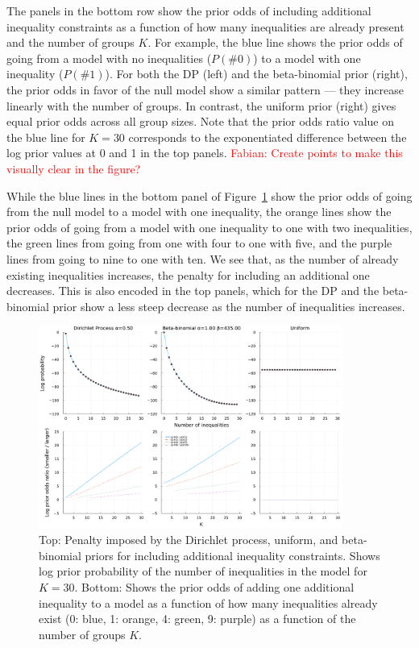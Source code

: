 \documentclass[11pt,a4paper]{article}
\theoremstyle{definition} %
\theoremstyle{case}
\newcommand{\FD}[1]{\textcolor{red}{Fabian: #1 }}
\begin{document}
The panels in the bottom row show the prior odds of including additional inequality constraints as a function of how many inequalities are already present and the number of groups $K$. For example, the blue line shows the prior odds of going from a model with no inequalities ($P(\#0)$) to a model with one inequality ($P(\#1)$). For both the DP (left) and the beta-binomial prior (right), the prior odds in favor of the null model show a similar pattern — they increase linearly with the number of groups. In contrast, the uniform prior (right) gives equal prior odds across all group sizes. Note that the prior odds ratio value on the blue line for $K = 30$ corresponds to the exponentiated difference between the log prior values at 0 and 1 in the top panels. \FD{Create points to make this visually clear in the figure?}

While the blue lines in the bottom panel of Figure~\ref{fig:scott_berger} show the prior odds of going from the null model to a model with one inequality, the orange lines show the prior odds of going from a model with one inequality to one with two inequalities, the green lines from going from one with four to one with five, and the purple lines from going to nine to one with ten. We see that, as the number of already existing inequalities increases, the penalty for including an additional one decreases. This is also encoded in the top panels, which for the DP and the beta-binomial prior show a less steep decrease as the number of inequalities increases.

\begin{figure}
    \centering
    \includegraphics[width=0.89\textwidth]{figures/prior_comparison_plot_2x3_log_scale.pdf}
    \caption{Top: Penalty imposed by the Dirichlet process, uniform, and beta-binomial priors for including additional inequality constraints. Shows log prior probability of the number of inequalities in the model for $K = 30$. Bottom: Shows the prior odds of adding one additional inequality to a model as a function of how many inequalities already exist (0: blue, 1: orange, 4: green, 9: purple) as a function of the number of groups $K$.}
    \label{fig:scott_berger}
\end{figure}
\fi
\end{document}
